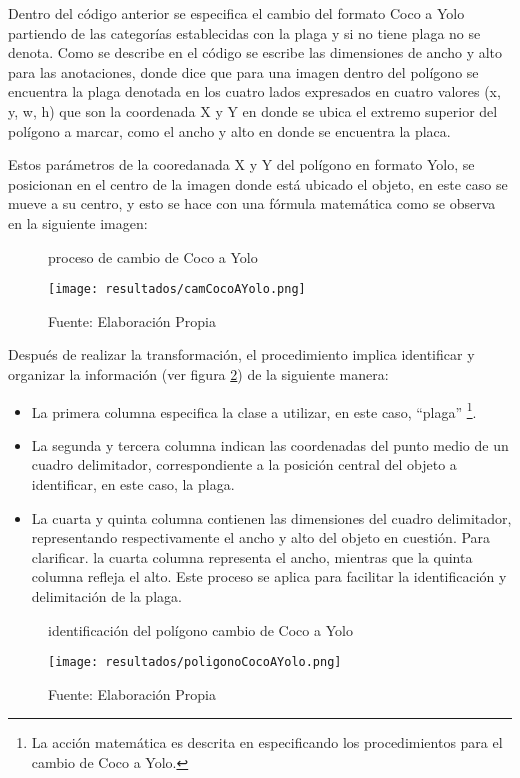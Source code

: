Dentro del código anterior se especifica el cambio del formato Coco a Yolo partiendo de las categorías establecidas con la plaga y si no tiene plaga no se denota. Como se describe en el código se escribe las dimensiones de ancho y alto para las anotaciones, donde dice que para una imagen dentro del polígono se encuentra la plaga denotada en los cuatro lados expresados en cuatro valores (x, y, w, h) que son la coordenada X y Y en donde se ubica el extremo superior del polígono a marcar, como el ancho y alto en donde se encuentra la placa.

Estos parámetros de la cooredanada X y Y del polígono en formato Yolo, se posicionan en el centro de la imagen donde está ubicado el objeto, en este caso se mueve a su centro, y esto se hace con una fórmula matemática  como se observa en la siguiente imagen:


\begin{figure}[h]
\centering
\caption{proceso de cambio de Coco a Yolo}
\texttt{[image: resultados/camCocoAYolo.png]}
\caption*{\footnotesize Fuente: Elaboración Propia}
\label{fig:figuraCamCocoAYolo}
\end{figure}

\newpage

Después de realizar la transformación, el procedimiento implica identificar y organizar la información (ver figura \ref{fig:figuraPoligonoCocoAYolo}) de la siguiente manera:
\begin{itemize}
    \item La primera columna especifica la clase a utilizar, en este caso, ``plaga'' \footnote{La acción matemática es descrita en \cite{rehman2022conversion} especificando los procedimientos para el cambio de Coco a Yolo.}. 
    \item La segunda y tercera columna indican las coordenadas del punto medio de un cuadro delimitador, correspondiente a la posición central del objeto a identificar, en este caso, la plaga. 
    \item La cuarta y quinta columna contienen las dimensiones del cuadro delimitador, representando respectivamente el ancho y alto del objeto en cuestión. Para clarificar. la cuarta columna representa el ancho, mientras que la quinta columna refleja el alto. Este proceso se aplica para facilitar la identificación y delimitación de la plaga.
\end{itemize}

\begin{figure}[h]
\centering
\caption{identificación del polígono cambio de Coco a Yolo}
\texttt{[image: resultados/poligonoCocoAYolo.png]}
\caption*{\footnotesize Fuente: Elaboración Propia}
\label{fig:figuraPoligonoCocoAYolo}
\end{figure}

